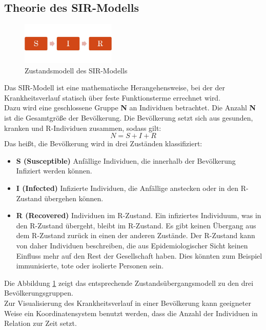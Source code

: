 \subsection*{Theorie des SIR-Modells}
\begin{figure}[b]
	\centering
\includegraphics[width= 0.4\textwidth]{./images/SIR-Modell.jpg}\caption{Zustandsmodell des SIR-Modells}\label{fig:SIR}
\end{figure}
Das SIR-Modell ist eine mathematische Herangehensweise, bei der der Krankheitsverlauf statisch über feste Funktionsterme errechnet wird. \\
Dazu wird eine geschlossene Gruppe \textbf{N} an Individuen betrachtet. Die Anzahl \textbf{N} ist die Gesamtgröße der Bevölkerung. Die Bevölkerung setzt sich aus gesunden, kranken und \glqq R\grqq-Individuen zusammen, sodass gilt:
\begin{equation}\label{eq:N}
N = S + I + R
\end{equation}
Das heißt, die Bevölkerung wird in drei Zuständen klassifiziert:
\begin{itemize}
\item \textbf{S (Susceptible)} Anfällige Individuen, die innerhalb der Bevölkerung Infiziert werden können.
\item \textbf{I (Infected)} Infizierte Individuen, die Anfällige anstecken  oder in den \glqq R\grqq -Zustand übergehen können.
\item \textbf{R (Recovered)} Individuen im \glqq R\grqq -Zustand. Ein infiziertes Individuum, was in den \glqq R\grqq -Zustand übergeht, bleibt im R-Zustand. Es gibt keinen Übergang aus dem \glqq R\grqq -Zustand zurück in einen der anderen Zustände. Der \glqq R\grqq -Zustand kann von daher Individuen beschreiben, die aus Epidemiologischer Sicht keinen Einfluss mehr auf den Rest der Gesellschaft haben. Dies könnten zum Beispiel immunisierte, tote oder isolierte Personen sein.
\end{itemize}
Die Abbildung \ref{fig:SIR} zeigt das entsprechende Zustandsübergangsmodell zu den drei Bevölkerungsgruppen.\\
Zur Visualisierung des Krankheitsverlauf in einer Bevölkerung kann geeigneter Weise ein Koordinatensystem benutzt werden, dass die Anzahl der Individuen in Relation zur Zeit setzt.
